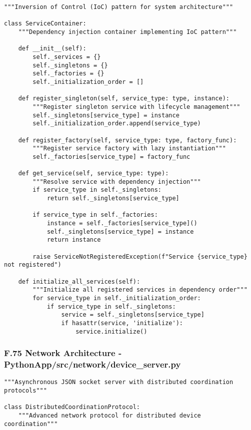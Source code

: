 \documentclass[12pt,a4paper]{article}
\begin{document}
{{\begin{verbatim}
"""Inversion of Control (IoC) pattern for system architecture"""

class ServiceContainer:
    """Dependency injection container implementing IoC pattern"""
    
    def __init__(self):
        self._services = {}
        self._singletons = {}
        self._factories = {}
        self._initialization_order = []
    
    def register_singleton(self, service_type: type, instance):
        """Register singleton service with lifecycle management"""
        self._singletons[service_type] = instance
        self._initialization_order.append(service_type)
    
    def register_factory(self, service_type: type, factory_func):
        """Register service factory with lazy instantiation"""
        self._factories[service_type] = factory_func
    
    def get_service(self, service_type: type):
        """Resolve service with dependency injection"""
        if service_type in self._singletons:
            return self._singletons[service_type]
        
        if service_type in self._factories:
            instance = self._factories[service_type]()
            self._singletons[service_type] = instance
            return instance
        
        raise ServiceNotRegisteredException(f"Service {service_type} not registered")
    
    def initialize_all_services(self):
        """Initialize all registered services in dependency order"""
        for service_type in self._initialization_order:
            if service_type in self._singletons:
                service = self._singletons[service_type]
                if hasattr(service, 'initialize'):
                    service.initialize()
\end{verbatim}

\subsubsection{F.75 Network Architecture - PythonApp/src/network/device_server.py}

\begin{verbatim}
"""Asynchronous JSON socket server with distributed coordination protocols"""

class DistributedCoordinationProtocol:
    """Advanced network protocol for distributed device coordination"""
    

\end{verbatim}}}
\end{document}
